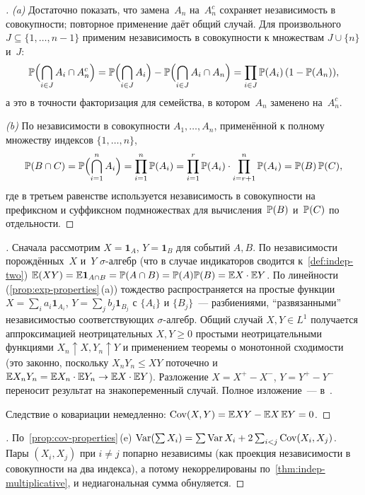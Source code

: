 \begin{proof}[]
\emph{(a)} Достаточно показать, что замена~$A_n$ на~$A_n^c$ сохраняет независимость в совокупности; повторное применение даёт общий случай. Для произвольного $J \subseteq \{1, \dots, n-1\}$ применим независимость в совокупности к множествам $J \cup \{n\}$ и~$J$:
\[
  \mathbb{P}\Bigl(\bigcap_{i \in J} A_i \cap A_n^c\Bigr) = \mathbb{P}\Bigl(\bigcap_{i \in J} A_i\Bigr) - \mathbb{P}\Bigl(\bigcap_{i \in J} A_i \cap A_n\Bigr) = \prod_{i \in J} \mathbb{P}(A_i)\, (1 - \mathbb{P}(A_n)),
\]
а это в точности факторизация для семейства, в котором~$A_n$ заменено на~$A_n^c$.

\emph{(b)} По независимости в совокупности $A_1, \dots, A_n$, применённой к полному множеству индексов $\{1, \dots, n\}$,
\[
  \mathbb{P}(B \cap C) = \mathbb{P}\Bigl(\bigcap_{i=1}^{n} A_i\Bigr) = \prod_{i=1}^{n} \mathbb{P}(A_i) = \prod_{i=1}^{r} \mathbb{P}(A_i) \cdot \prod_{i=r+1}^{n} \mathbb{P}(A_i) = \mathbb{P}(B)\, \mathbb{P}(C),
\]
где в третьем равенстве используется независимость в совокупности на префиксном и суффиксном подмножествах для вычисления~$\mathbb{P}(B)$ и~$\mathbb{P}(C)$ по отдельности.
\end{proof}

\begin{proof}[]
Сначала рассмотрим $X = \mathbf{1}_A$, $Y = \mathbf{1}_B$ для событий $A, B$. По независимости порождённых~$X$ и~$Y$ $\sigma$-алгебр (что в случае индикаторов сводится к~\cref{def:indep-two}) $\mathbb{E}(XY) = \mathbb{E} \mathbf{1}_{A \cap B} = \mathbb{P}(A \cap B) = \mathbb{P}(A) \mathbb{P}(B) = \mathbb{E} X \cdot \mathbb{E} Y$. По линейности (\cref{prop:exp-properties}\,(a)) тождество распространяется на простые функции $X = \sum_i a_i \mathbf{1}_{A_i}$, $Y = \sum_j b_j \mathbf{1}_{B_j}$ с $\{A_i\}$ и $\{B_j\}$~--- разбиениями, ``развязанными'' независимостью соответствующих $\sigma$-алгебр. Общий случай $X, Y \in L^1$ получается аппроксимацией неотрицательных $X, Y \geq 0$ простыми неотрицательными функциями $X_n \uparrow X, Y_n \uparrow Y$ и применением теоремы о монотонной сходимости (это законно, поскольку $X_n Y_n \leq XY$ поточечно и $\mathbb{E} X_n Y_n = \mathbb{E} X_n \cdot \mathbb{E} Y_n \to \mathbb{E} X \cdot \mathbb{E} Y$). Разложение $X = X^+ - X^-$, $Y = Y^+ - Y^-$ переносит результат на знакопеременный случай. Полное изложение~--- в~\cite[гл.~II, \S~6]{Shiryaev1989}.

Следствие о ковариации немедленно: $\operatorname{Cov}(X, Y) = \mathbb{E} XY - \mathbb{E} X\, \mathbb{E} Y = 0$.
\end{proof}

\begin{proof}[]
По~\cref{prop:cov-properties}\,(e) $\operatorname{Var}(\sum X_i) = \sum \operatorname{Var} X_i + 2 \sum_{i < j} \operatorname{Cov}(X_i, X_j)$. Пары $(X_i, X_j)$ при $i \neq j$ попарно независимы (как проекция независимости в совокупности на два индекса), а потому некоррелированы по~\cref{thm:indep-multiplicative}, и недиагональная сумма обнуляется.
\end{proof}

